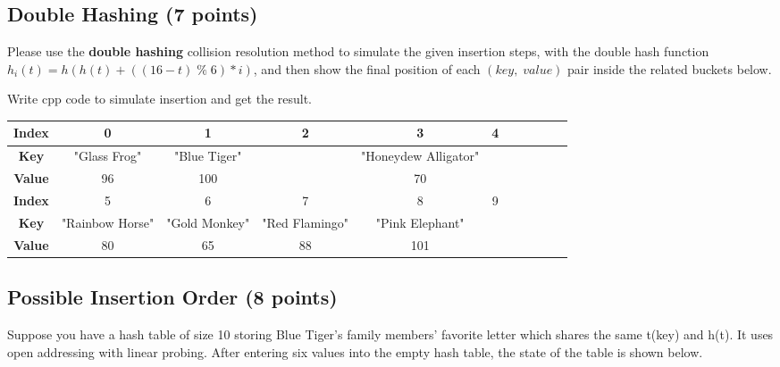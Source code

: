 \documentclass[11pt]{exam}
\begin{document}
\subsection{Double Hashing (7 points)}
Please use the \textbf{double hashing} collision resolution method to simulate the given insertion steps, with the double hash function $h_i(t) = h(h(t)+((16-t)\;\%\; 6) * i)$, and then show the final position of each $(key,\;value)$ pair inside the related buckets below.
\begin{solution}
    Write cpp code to simulate insertion and get the result.
    \begin{table}[H]
        \centering
        \footnotesize
        \renewcommand{\arraystretch}{2}
        \begin{tabular}{|c|c|c|c|c|c|c|c|c|c|c|}
            \hline
            \textbf{Index} & 0               & 1             & 2              & 3                    & 4 \\
            \hline
            \textbf{Key}   & "Glass Frog"    & "Blue Tiger"  &                & "Honeydew Alligator" &   \\
            \hline
            \textbf{Value} & 96              & 100           &                & 70                   &   \\
            \hline
            \textbf{Index} & 5               & 6             & 7              & 8                    & 9 \\
            \hline
            \textbf{Key}   & "Rainbow Horse" & "Gold Monkey" & "Red Flamingo" & "Pink Elephant"      &   \\
            \hline
            \textbf{Value} & 80              & 65            & 88             & 101                  &   \\
            \hline
        \end{tabular}
    \end{table}
\end{solution}

\subsection{Possible Insertion Order (8 points)}
Suppose you have a hash table of size 10 storing Blue Tiger's family members' favorite letter which shares the same t(key) and h(t). It uses open addressing with linear probing. After entering six values into the empty hash table, the state of the table is shown below.
\end{document}
